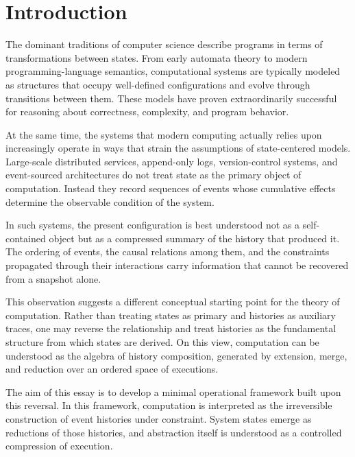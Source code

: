\documentclass[12pt]{article}
\begin{document}
\tableofcontents

\newpage


\section*{Introduction}

The dominant traditions of computer science describe programs
in terms of transformations between states. From early automata
theory to modern programming-language semantics, computational
systems are typically modeled as structures that occupy
well-defined configurations and evolve through transitions
between them. These models have proven extraordinarily
successful for reasoning about correctness, complexity,
and program behavior.

At the same time, the systems that modern computing
actually relies upon increasingly operate in ways that
strain the assumptions of state-centered models.
Large-scale distributed services, append-only logs,
version-control systems, and event-sourced architectures
do not treat state as the primary object of computation.
Instead they record sequences of events whose cumulative
effects determine the observable condition of the system.

In such systems, the present configuration is best understood
not as a self-contained object but as a compressed summary
of the history that produced it. The ordering of events,
the causal relations among them, and the constraints
propagated through their interactions carry information
that cannot be recovered from a snapshot alone.

This observation suggests a different conceptual starting
point for the theory of computation. Rather than treating
states as primary and histories as auxiliary traces,
one may reverse the relationship and treat histories
as the fundamental structure from which states are derived.
On this view, computation can be understood as the algebra
of history composition, generated by extension, merge, and
reduction over an ordered space of executions.

The aim of this essay is to develop a minimal operational
framework built upon this reversal. In this framework,
computation is interpreted as the irreversible construction
of event histories under constraint. System states emerge
as reductions of those histories, and abstraction itself
is understood as a controlled compression of execution.
\end{document}
